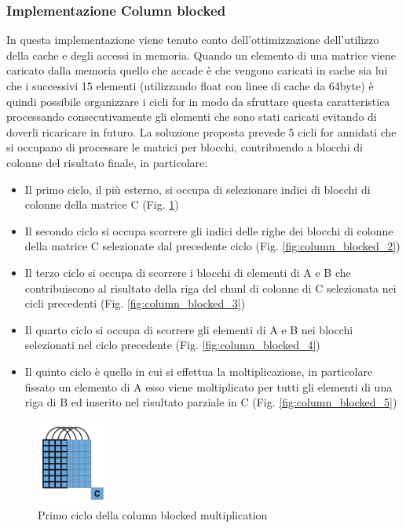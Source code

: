\documentclass[conference]{IEEEtran}
\begin{document}
\subsubsection{Implementazione Column blocked}
In questa implementazione viene tenuto conto dell'ottimizzazione dell'utilizzo della cache e degli accessi in memoria. Quando un elemento di una matrice viene caricato dalla memoria quello che accade è che vengono caricati in cache sia lui che i successivi 15 elementi (utilizzando float con linee di cache da 64byte) è quindi possibile organizzare i cicli for in modo da sfruttare questa caratteristica processando consecutivamente gli elementi che sono stati caricati evitando di doverli ricaricare in futuro.
La soluzione proposta prevede 5 cicli for annidati che si occupano di processare le matrici per blocchi, contribuendo a blocchi di colonne del risultato finale, in particolare:
\begin{itemize}
    \item Il primo ciclo, il più esterno, si occupa di selezionare indici di blocchi di colonne della matrice C (Fig. \ref{fig:column_blocked_1})
    \item Il secondo ciclo si occupa scorrere gli indici delle righe dei blocchi di colonne della matrice C selezionate dal precedente ciclo (Fig. \ref{fig:column_blocked_2})
    \item Il terzo ciclo si occupa di scorrere i blocchi di elementi di A e B che contribuiscono al risultato della riga del chunl di colonne di C selezionata nei cicli precedenti (Fig. \ref{fig:column_blocked_3})
    \item Il quarto ciclo si occupa di scorrere gli elementi di A e B nei blocchi selezionati nel ciclo precedente (Fig. \ref{fig:column_blocked_4})
    \item Il quinto ciclo è quello in cui si effettua la moltiplicazione, in particolare fissato un elemento di A esso viene moltiplicato per tutti gli elementi di una riga di B ed inserito nel risultato parziale in C (Fig. \ref{fig:column_blocked_5})
\end{itemize}
\begin{figure}[H]
    \centering
    \includegraphics[width=0.2\textwidth]{resources/column_blocked_1.png}
    \caption{Primo ciclo della column blocked multiplication}
    \label{fig:column_blocked_1}
\end{figure}
\end{document}
